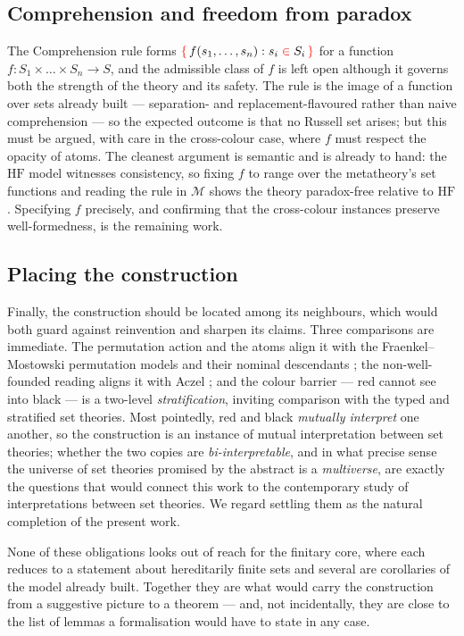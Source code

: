 \subsection{Comprehension and freedom from paradox}
\label{sec:rigor:compr}

The $\mathrm{Comprehension}$ rule forms $\textcolor{red}{\{}\,f(s_1,\dots,s_n) : s_i \mathrel{\textcolor{red}{\in}} S_i\,\textcolor{red}{\}}$ for
a function $f\colon S_1\times\dots\times S_n\to S$, and the admissible class of
$f$ is left open although it governs both the strength of the theory and its
safety. The rule is the image of a function over sets already built ---
separation- and replacement-flavoured rather than naive comprehension --- so the
expected outcome is that no Russell set arises; but this must be argued, with
care in the cross-colour case, where $f$ must respect the opacity of atoms. The
cleanest argument is semantic and is already to hand: the $\mathrm{HF}$ model
witnesses consistency, so fixing $f$ to range over the metatheory's set functions
and reading the rule in $\mathcal{M}$ shows the theory paradox-free relative to
$\mathrm{HF}$. Specifying $f$ precisely, and confirming that the cross-colour
instances preserve well-formedness, is the remaining work.

\subsection{Placing the construction}
\label{sec:rigor:place}

Finally, the construction should be located among its neighbours, which would
both guard against reinvention and sharpen its claims. Three comparisons are
immediate. The permutation action and the atoms align it with the
Fraenkel--Mostowski permutation models and their nominal descendants
\cite{DBLP:journals/fac/GabbayP02}; the non-well-founded reading aligns it with
Aczel \cite{aczel1988nwf}; and the colour barrier --- red cannot see into black
--- is a two-level \emph{stratification}, inviting comparison with the typed and
stratified set theories. Most pointedly, red and black \emph{mutually interpret}
one another, so the construction is an instance of mutual interpretation between
set theories; whether the two copies are \emph{bi-interpretable}, and in what
precise sense the universe of set theories promised by the abstract is a
\emph{multiverse}, are exactly the questions that would connect this work to the
contemporary study of interpretations between set theories. We regard settling
them as the natural completion of the present work.

None of these obligations looks out of reach for the finitary core, where each
reduces to a statement about hereditarily finite sets and several are corollaries
of the model already built. Together they are what would carry the construction
from a suggestive picture to a theorem --- and, not incidentally, they are close
to the list of lemmas a formalisation would have to state in any case.
